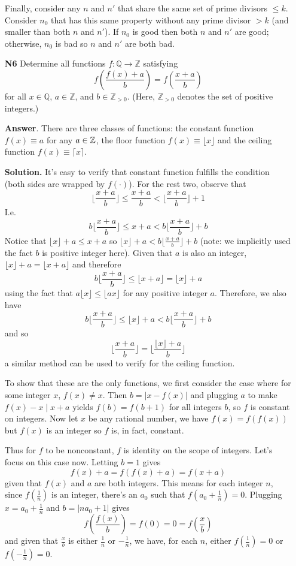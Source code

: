\documentclass[11pt,a4paper]{article}
\begin{document}
\begin{enumerate}
		Finally, consider any $n$ and $n'$ that share the same set of prime divisors $\le k$. Consider $n_0$ that has this same property without any prime divisor $>k$ (and smaller than both $n$ and $n'$). If $n_0$ is good then both $n$ and $n'$ are good; otherwise, $n_0$ is bad so $n$ and $n'$ are both bad. 
		
		\item [\textbf{N6}] Determine all functions $f: \mathbb{Q} \rightarrow \mathbb{Z} $ satisfying
		\[ f \left( \frac{f(x)+a} {b}\right) = f \left( \frac{x+a}{b} \right) \]
		for all  $x \in \mathbb{Q}$, $a \in \mathbb{Z}$, and $b \in \mathbb{Z}_{>0}$. (Here, $\mathbb{Z}_{>0}$ denotes the set of positive integers.)	
		
		\textbf{Answer}. There are three classes of functions: the constant function $f(x)\equiv a$ for any $a\in\mathbb{Z}$, the floor function $f(x)\equiv\lfloor x\rfloor $ and the ceiling function $f(x)\equiv \lceil x\rceil$. 
		
		\textbf{Solution.} It's easy to verify that constant function fulfills the condition (both sides are wrapped by $f(\cdot)$). For the rest two, observe that 
		\[
		\lfloor \frac{x+a}{b}\rfloor\le \frac{x+a}{b} < \lfloor \frac{x+a}{b}\rfloor + 1
		\]
		I.e. 
		\[
		b\lfloor \frac{x+a}{b}\rfloor\le x+a < b\lfloor \frac{x+a}{b}\rfloor + b
		\]
		Notice that $\lfloor x\rfloor +a\le x+a$ so $\lfloor x\rfloor+a< b\lfloor \frac{x+a}{b}\rfloor + b$ (note: we implicitly used the fact $b$ is positive integer here). 
		Given that $a$ is also an integer, $\lfloor x\rfloor +a=\lfloor x+a\rfloor$ and therefore 
		\[
		b\lfloor \frac{x+a}{b}\rfloor\le \lfloor x+a\rfloor = \lfloor x\rfloor+a
		\]
		using the fact that $a\lfloor x\rfloor \le \lfloor ax \rfloor $ for any positive integer $a$. 
		Therefore, we also have 
		\[
		b\lfloor \frac{x+a}{b}\rfloor\le \lfloor x\rfloor +a < b\lfloor \frac{x+a}{b}\rfloor + b
		\]
		and so 
		\[
		\lfloor \frac{x+a}{b}\rfloor = \lfloor \frac{\lfloor x\rfloor +a}{b}\rfloor
		\]
		a similar method can be used to verify for the ceiling function. 
		
		To show that these are the only functions, we first consider the case where for some integer $x$, $f(x)\neq x$. Then $b=|x-f(x)|$ and plugging $a$ to make $f(x)-x\mid x+a$ yields $f(b)=f(b+1)$ for all integers $b$, so $f$ is constant on integers. Now let $x$ be any rational number, we have $f(x)=f(f(x))$ but $f(x)$ is an integer so $f$ is, in fact, constant. 
		
		Thus for $f$ to be nonconstant, $f$ is identity on the scope of integers. Let's focus on this case now. Letting $b=1$ gives 
		\[
		f(x)+a=f(f(x)+a)=f(x+a)
		\]
		given that $f(x)$ and $a$ are both integers. 
		This means for each integer $n$, since $f(\frac 1n)$ is an integer, there's an $a_0$ such that $f(a_0+\frac 1n)=0$. Plugging $x=a_0+\frac 1n$ and $b=|na_0+1|$ gives 
		\[
		f(\frac{f(x)}{b})=f(0)=0=f(\frac{x}{b})
		\]
		and given that $\frac{x}{b}$ is either $\frac 1n$ or $-\frac 1n$, we have, for each $n$, either $f(\frac 1n)=0$ or $f(-\frac 1n)=0$. 
		

\end{enumerate}
\end{document}
